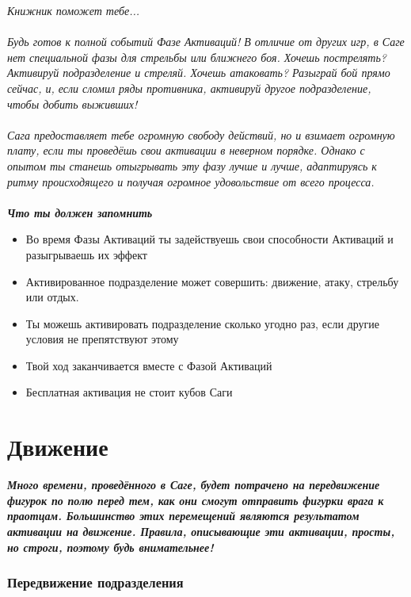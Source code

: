 \documentclass[a4paper,11pt,twoside]{article}
\begin{document}
\begingroup
\fontsize{15pt}{11pt}\selectfont
\textit{Книжник поможет тебе...}\\ \\
\fontsize{11pt}{11pt}\selectfont
\textit{Будь готов к полной событий Фазе Активаций! В отличие от других игр, в Саге нет специальной фазы для стрельбы или ближнего боя. Хочешь пострелять? Активируй подразделение и стреляй. Хочешь атаковать? Разыграй бой прямо сейчас, и, если сломил ряды противника, активируй другое подразделение, чтобы добить выживших! \\ \\
Сага предоставляет тебе огромную свободу действий, но и взимает огромную плату, если ты проведёшь свои активации в неверном порядке. Однако с опытом ты станешь отыгрывать эту фазу лучше и лучше, адаптируясь к ритму происходящего и получая огромное удовольствие от всего процесса.}
\endgroup 
\\ \\
\begingroup
\fontsize{15pt}{11pt}\selectfont
\textit{\textbf{Что ты должен запомнить}}\\ 
\fontsize{11pt}{11pt}\selectfont
\begin{itemize}
	\item Во время Фазы Активаций ты задействуешь свои способности Активаций и разыгрываешь их эффект
	\item Активированное подразделение может совершить: движение, атаку, стрельбу или отдых.
	\item Ты можешь активировать подразделение сколько угодно раз, если другие условия не препятствуют этому
	\item Твой ход заканчивается вместе с Фазой Активаций
	\item Бесплатная активация не стоит кубов Саги
\end{itemize}
\endgroup 
\newpage

\part{Движение}
\textbf{\textit{Много времени, проведённого в Саге, будет потрачено на передвижение фигурок по полю перед тем, как они смогут отправить фигурки врага к праотцам. Большинство этих перемещений являются результатом активации на движение. Правила, описывающие эти активации, просты, но строги, поэтому будь внимательнее! }}

\section*{Передвижение подразделения}
\end{document}
